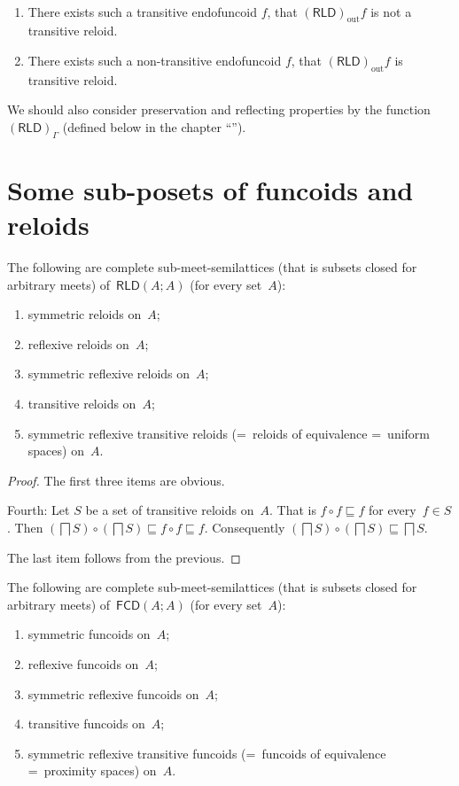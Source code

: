 \begin{conjecture}
  ~  
  \begin{enumerate}
    \item There exists such a transitive endofuncoid $f$, that
    $(\mathsf{RLD})_{\operatorname{out}} f$ is not a transitive reloid.
    
    \item There exists such a non-transitive endofuncoid $f$, that
    $(\mathsf{RLD})_{\operatorname{out}} f$ is transitive reloid.
  \end{enumerate}
\end{conjecture}

We should also consider preservation and reflecting properties by the function
$(\mathsf{RLD})_{\Gamma}$ (defined below in the chapter ``'').

\section{Some sub-posets of funcoids and reloids}

\begin{prop}
The following are complete sub-meet-semilattices (that is subsets closed for arbitrary meets) of~$\mathsf{RLD}(A;A)$ (for every set~$A$):
\begin{enumerate}
\item symmetric reloids on~$A$;
\item reflexive reloids on~$A$;
\item symmetric reflexive reloids on~$A$;
\item transitive reloids on~$A$;
\item symmetric reflexive transitive reloids (=~reloids of equivalence =~uniform spaces) on~$A$.
\end{enumerate}
\end{prop}

\begin{proof}
The first three items are obvious.

Fourth: Let $S$ be a set of transitive reloids on~$A$. That is $f\circ f\sqsubseteq f$ for every~$f\in S$. Then $(\bigsqcap S)\circ(\bigsqcap S)\sqsubseteq f\circ f\sqsubseteq f$.
Consequently $(\bigsqcap S)\circ(\bigsqcap S)\sqsubseteq \bigsqcap S$.

The last item follows from the previous.
\end{proof}


\begin{prop}
The following are complete sub-meet-semilattices (that is subsets closed for arbitrary meets) of~$\mathsf{FCD}(A;A)$ (for every set~$A$):
\begin{enumerate}
\item symmetric funcoids on~$A$;
\item reflexive funcoids on~$A$;
\item symmetric reflexive funcoids on~$A$;
\item transitive funcoids on~$A$;
\item symmetric reflexive transitive funcoids (=~funcoids of equivalence =~proximity spaces) on~$A$.
\end{enumerate}
\end{prop}


